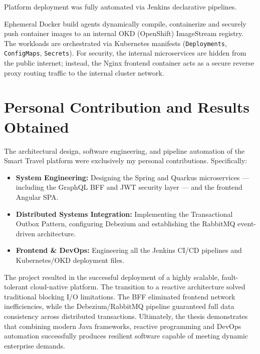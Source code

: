 Platform deployment was fully automated via Jenkins declarative pipelines. 

Ephemeral Docker build agents dynamically compile, containerize and securely push container images to an internal OKD (OpenShift) ImageStream registry. The workloads are orchestrated via Kubernetes manifests (\texttt{Deployments}, \texttt{ConfigMaps}, \texttt{Secrets}). For security, the internal microservices are hidden from the public internet; instead, the Nginx frontend container acts as a secure reverse proxy routing traffic to the internal cluster network.

\section{Personal Contribution and Results Obtained}

The architectural design, software engineering, and pipeline automation of the Smart Travel platform were exclusively my personal contributions. Specifically:

\begin{itemize}
    \item \textbf{System Engineering:} Designing the Spring and Quarkus microservices --- including the GraphQL BFF and JWT security layer --- and the frontend Angular SPA.
    \item \textbf{Distributed Systems Integration:} Implementing the Transactional Outbox Pattern, configuring Debezium and establishing the RabbitMQ event-driven architecture.
    \item \textbf{Frontend \& DevOps:} Engineering all the Jenkins CI/CD pipelines and Kubernetes/OKD deployment files.
\end{itemize}

The project resulted in the successful deployment of a highly scalable, fault-tolerant cloud-native platform. The transition to a reactive architecture solved traditional blocking I/O limitations. The BFF eliminated frontend network inefficiencies, while the Debezium/RabbitMQ pipeline guaranteed full data consistency across distributed transactions. Ultimately, the thesis demonstrates that combining modern Java frameworks, reactive programming and DevOps automation successfully produces resilient software capable of meeting dynamic enterprise demands.